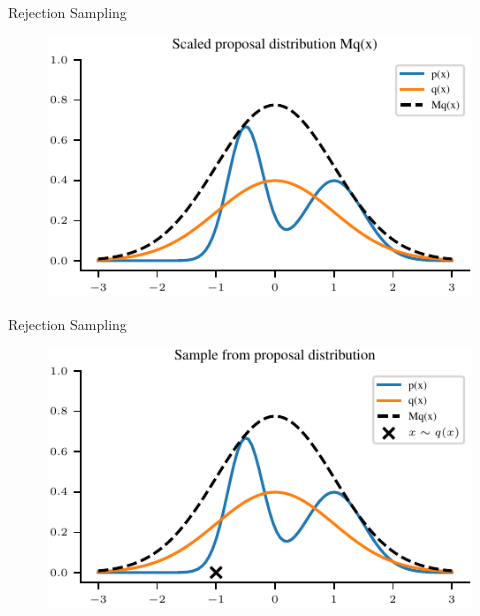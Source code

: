 \documentclass[handout]{beamer}
\begin{document}
    \begin{frame}{Rejection Sampling}
        \begin{figure}
            \centering
            \includegraphics{notebooks/figures/sampling/rejection-sampling--1.0-True-True-False-False-False-False-False-False.pdf}
        \end{figure}
    \end{frame}

    \begin{frame}{Rejection Sampling}
        \begin{figure}
            \centering
            \includegraphics{notebooks/figures/sampling/rejection-sampling--1.0-True-True-True-False-False-False-False-False.pdf}
        \end{figure}
    \end{frame}
\end{document}
